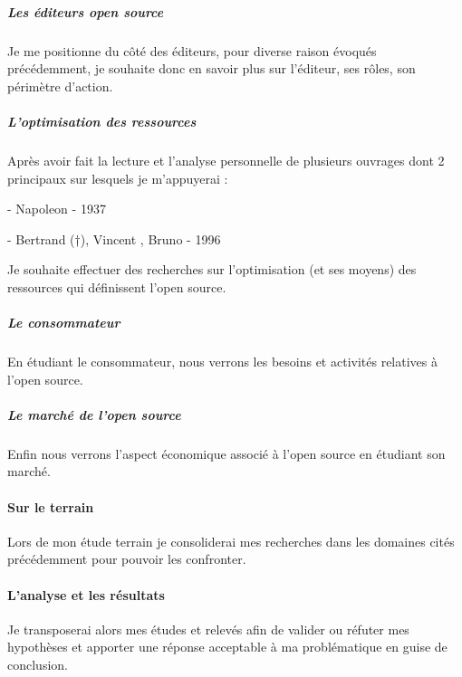 		\subparagraph{Les éditeurs open source\\}

		Je me positionne du côté des éditeurs, pour diverse raison évoqués précédemment, je souhaite donc en savoir plus sur l'éditeur, ses rôles, son périmètre d'action.

		\subparagraph{L'optimisation des ressources\\}
		
		Après avoir fait la lecture et l'analyse personnelle de plusieurs ouvrages dont 2 principaux sur lesquels je m'appuyerai : 
		
		\begin{displayquote}
			 - Napoleon  - 1937
		\end{displayquote}
		\begin{displayquote}
			 - Bertrand  (†), Vincent , Bruno \bsc{Jarrosson} - 1996
		\end{displayquote}
		
		Je souhaite effectuer des recherches sur l'optimisation (et ses moyens) des ressources qui définissent l'open source.

		\subparagraph{Le consommateur\\}
		En étudiant le consommateur, nous verrons les besoins et activités relatives à l'open source.

		\subparagraph{Le marché de l'open source\\}
		Enfin nous verrons l'aspect économique associé à l'open source en étudiant son marché.

		\paragraph{Sur le terrain \\}
		Lors de mon étude terrain je consoliderai mes recherches dans les domaines cités précédemment pour pouvoir les confronter.

		\paragraph{L'analyse et les résultats \\}
		Je transposerai alors mes études et relevés afin de valider ou réfuter mes hypothèses et apporter une réponse acceptable à ma problématique en guise de conclusion.
